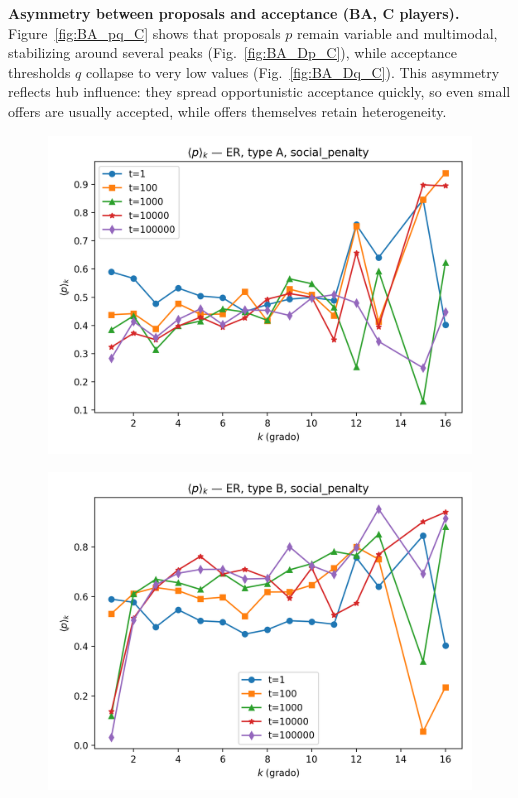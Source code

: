 \textbf{Asymmetry between proposals and acceptance (BA, C players).}  
Figure~\ref{fig:BA_pq_C} shows that proposals $p$ remain variable and
multimodal, stabilizing around several peaks (Fig.~\ref{fig:BA_Dp_C}), while
acceptance thresholds $q$ collapse to very low values
(Fig.~\ref{fig:BA_Dq_C}).  
This asymmetry reflects hub influence: they spread opportunistic acceptance
quickly, so even small offers are usually accepted, while offers themselves
retain heterogeneity.

\begin{figure}[h!]
    \centering
    \setlength{\tabcolsep}{2pt}
    \begin{minipage}[t]{0.48\textwidth}
        \centering
        \includegraphics[width=\textwidth]{images/TASK1/p_by_degree_ER_A_social_penalty.png}
        \label{fig:ER_lowdeg_p_SP}
    \end{minipage}
    \hfill
    \begin{minipage}[t]{0.48\textwidth}
        \centering
        \includegraphics[width=\textwidth]{images/TASK1/p_by_degree_ER_B_social_penalty.png}

\end{minipage}
\end{figure}
